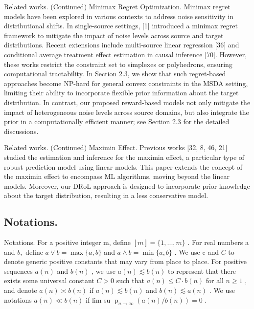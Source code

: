 \documentclass{beamer}
\begin{document}
\begin{frame}{Related works. (Continued)}
    Minimax Regret Optimization. Minimax regret models have been explored in various contexts to address noise sensitivity in distributional shifts. In single-source settings, [1] introduced a minimax regret framework to mitigate the impact of noise levels across source and target distributions. Recent extensions include multi-source linear regression [36] and conditional average treatment effect estimation in causal inference [70]. However, these works restrict the constraint set to simplexes or polyhedrons, ensuring computational tractability. In Section 2.3, we show that such regret-based approaches become NP-hard for general convex constraints in the MSDA setting, limiting their ability to incorporate flexible prior information about the target distribution. In contrast, our proposed reward-based models not only mitigate the impact of heterogeneous noise levels across source domains, but also integrate the prior in a computationally efficient manner; see Section 2.3 for the detailed discussions.
\end{frame}

\begin{frame}{Related works. (Continued)}
    Maximin Effect. Previous works [32, 8, 46, 21] studied the estimation and inference for the maximin effect, a particular type of robust prediction model using linear models. This paper extends the concept of the maximin effect to encompass ML algorithms, moving beyond the linear models. Moreover, our DRoL approach is designed to incorporate prior knowledge about the target distribution, resulting in a less conservative model.
\end{frame}

\subsection{Notations.}

\begin{frame}{Notations.}
    For a positive integer m, define $[ m ] = \{ 1 , . . . , m \}$ . For real numbers a and $b ,$ define $a \vee b = \operatorname* { m a x } \{ a , b \}$ and $a \wedge b = \operatorname* { m i n } \{ a , b \}$ . We use c and $C$ to denote generic positive constants that may vary from place to place. For positive sequences $a ( n )$ and $b ( n )$ , we use $a ( n ) \lesssim b ( n )$ to represent that there exists some universal constant $C > 0$ such that $a ( n ) \leq C \cdot b ( n )$ for all $n \geq 1$ , and denote $a ( n ) \asymp b ( n )$ if $a ( n ) \lesssim b ( n )$ and $b ( n ) \lesssim a ( n )$ . We use notations $a ( n ) \ll b ( n )$ if lim su $\operatorname { p } _ { n \to \infty } ( a ( n ) / b ( n ) ) = 0$ .
\end{frame}
\end{document}
